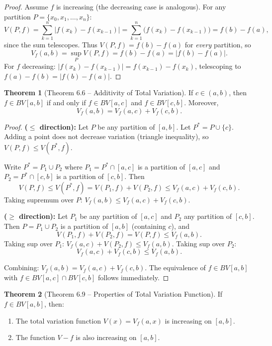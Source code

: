 \documentclass[12pt,a4paper]{article}
\theoremstyle{definition}
\newtheorem{theorem}{Theorem}[section]
\begin{document}
\begin{proof}
Assume $f$ is increasing (the decreasing case is analogous). For any partition $P = \{x_0, x_1, \ldots, x_n\}$:
\[
    V(P, f) = \sum_{k=1}^n |f(x_k) - f(x_{k-1})| = \sum_{k=1}^n \bigl(f(x_k) - f(x_{k-1})\bigr) = f(b) - f(a),
\]
since the sum telescopes. Thus $V(P,f) = f(b) - f(a)$ for \emph{every} partition, so
\[
    V_f(a,b) = \sup_P V(P,f) = f(b) - f(a) = |f(b) - f(a)|.
\]
For $f$ decreasing: $|f(x_k) - f(x_{k-1})| = f(x_{k-1}) - f(x_k)$, telescoping to $f(a) - f(b) = |f(b) - f(a)|$.
\end{proof}

\begin{theorem}[Theorem 6.6 -- Additivity of Total Variation]
If $c \in (a,b)$, then $f \in BV[a,b]$ if and only if $f \in BV[a,c]$ and $f \in BV[c,b]$. Moreover,
\[
    V_f(a,b) = V_f(a,c) + V_f(c,b).
\]
\end{theorem}

\begin{proof}
\textbf{($\leq$ direction):} Let $P$ be any partition of $[a,b]$. Let $P^* = P \cup \{c\}$. Adding a point does not decrease variation (triangle inequality), so $V(P,f) \leq V(P^*, f)$.

Write $P^* = P_1 \cup P_2$ where $P_1 = P^* \cap [a,c]$ is a partition of $[a,c]$ and $P_2 = P^* \cap [c,b]$ is a partition of $[c,b]$. Then
\[
    V(P, f) \leq V(P^*, f) = V(P_1, f) + V(P_2, f) \leq V_f(a,c) + V_f(c,b).
\]
Taking supremum over $P$: $V_f(a,b) \leq V_f(a,c) + V_f(c,b)$.

\textbf{($\geq$ direction):} Let $P_1$ be any partition of $[a,c]$ and $P_2$ any partition of $[c,b]$. Then $P = P_1 \cup P_2$ is a partition of $[a,b]$ (containing $c$), and
\[
    V(P_1, f) + V(P_2, f) = V(P, f) \leq V_f(a,b).
\]
Taking sup over $P_1$: $V_f(a,c) + V(P_2, f) \leq V_f(a,b)$. Taking sup over $P_2$:
\[
    V_f(a,c) + V_f(c,b) \leq V_f(a,b).
\]

Combining: $V_f(a,b) = V_f(a,c) + V_f(c,b)$. The equivalence of $f \in BV[a,b]$ with $f \in BV[a,c] \cap BV[c,b]$ follows immediately.
\end{proof}

\begin{theorem}[Theorem 6.9 -- Properties of Total Variation Function]
If $f \in BV[a,b]$, then:
\begin{enumerate}[label=(\alph*)]
    \item The total variation function $V(x) = V_f(a,x)$ is increasing on $[a,b]$.
    \item The function $V - f$ is also increasing on $[a,b]$.
\end{enumerate}
\end{theorem}
\end{document}
